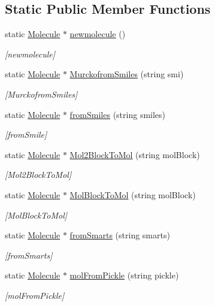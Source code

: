 \subsection*{Static Public Member Functions}
\begin{DoxyCompactItemize}
\item 
static \hyperlink{class_molecule}{Molecule} $\ast$ \hyperlink{class_molecule_ab7813a959f80b5291f43f6b84b775ff5}{newmolecule} ()
\begin{DoxyCompactList}\small\item\em \mbox{[}newmolecule\mbox{]} \end{DoxyCompactList}\item 
static \hyperlink{class_molecule}{Molecule} $\ast$ \hyperlink{class_molecule_aa5264564f658fcca3635b11f6735c874}{Murckofrom\+Smiles} (string smi)
\begin{DoxyCompactList}\small\item\em \mbox{[}Murckofrom\+Smiles\mbox{]} \end{DoxyCompactList}\item 
static \hyperlink{class_molecule}{Molecule} $\ast$ \hyperlink{class_molecule_ab069ae65453c626353782b9accc1235a}{from\+Smiles} (string smiles)
\begin{DoxyCompactList}\small\item\em \mbox{[}from\+Smile\mbox{]} \end{DoxyCompactList}\item 
static \hyperlink{class_molecule}{Molecule} $\ast$ \hyperlink{class_molecule_a689a07968c44db22ef925eee7f70295b}{Mol2\+Block\+To\+Mol} (string mol\+Block)
\begin{DoxyCompactList}\small\item\em \mbox{[}Mol2\+Block\+To\+Mol\mbox{]} \end{DoxyCompactList}\item 
static \hyperlink{class_molecule}{Molecule} $\ast$ \hyperlink{class_molecule_a75b3d11ee3b2ccacad2f5ae1c6909b19}{Mol\+Block\+To\+Mol} (string mol\+Block)
\begin{DoxyCompactList}\small\item\em \mbox{[}Mol\+Block\+To\+Mol\mbox{]} \end{DoxyCompactList}\item 
static \hyperlink{class_molecule}{Molecule} $\ast$ \hyperlink{class_molecule_a2edb1181b6a08aa8da482ff6a08ad157}{from\+Smarts} (string smarts)
\begin{DoxyCompactList}\small\item\em \mbox{[}from\+Smarts\mbox{]} \end{DoxyCompactList}\item 
static \hyperlink{class_molecule}{Molecule} $\ast$ \hyperlink{class_molecule_a2425937fefa34d28560ef4ad152b9602}{mol\+From\+Pickle} (string pickle)
\begin{DoxyCompactList}\small\item\em \mbox{[}mol\+From\+Pickle\mbox{]} \end{DoxyCompactList}\end{DoxyCompactItemize}


